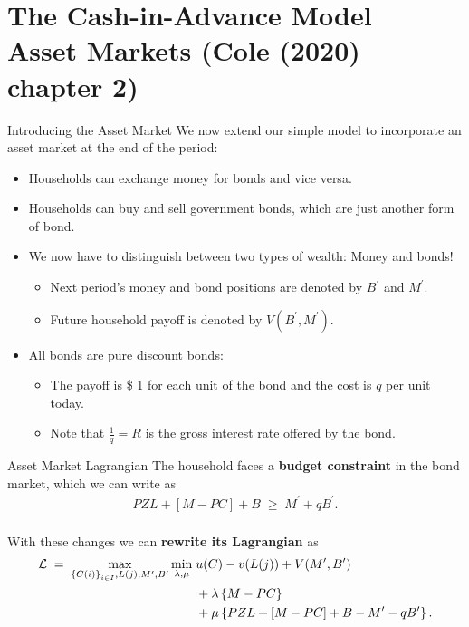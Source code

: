 \documentclass[10pt,c,aspectratio=1610,handout]{beamer}
\begin{document}
\section{The Cash-in-Advance Model\\\small{Asset Markets (Cole (2020) chapter 2)}}
\begin{frame}{Introducing the Asset Market}%
  We now extend our simple model to incorporate an asset market at the end of the period:%
  \pause%
  \begin{itemize}%
    \item[$\blacktriangleright$] Households can exchange money for bonds and vice versa.%
    \pause%
    \item[$\blacktriangleright$] Households can buy and sell government bonds, which are just another form of bond.%
    \pause%
    \item[$\blacktriangleright$] We now have to distinguish between two types of wealth: Money and bonds!%
    \begin{itemize}%
      \item[$\rightarrow$] Next period's money and bond positions are denoted by $B^{\prime}$ and $M^{\prime}$.%
      \item[$\rightarrow$] Future household payoff is denoted by $V(B^{\prime}, M^{\prime})$.%
    \end{itemize}%
    \pause%
    \item[$\blacktriangleright$] All bonds are pure discount bonds:%
    \begin{itemize}%
      \item[$\rightarrow$] The payoff is \$ 1 for each unit of the bond and the cost is $q$ per unit today.%
      \item[$\rightarrow$] Note that $\frac{1}{q} = R$ is the gross interest rate offered by the bond.%
    \end{itemize}%
  \end{itemize}%
\end{frame}%
\begin{frame}{Asset Market Lagrangian}%
  The household faces a \textbf{budget constraint} in the bond market, which we can write as%
  \begin{align*}%
    P Z L + \left[ M - PC \right] + B \; \geq \; M^{\prime} + q B^{\prime}.%
  \end{align*}\\%
  \vspace*{0.25in}%
  \pause%
  With these changes we can \textbf{rewrite its Lagrangian} as%
  \begin{align*}%
    \mathcal{L} \; = \; \max_{\left\{ C(i)\right\} _{i\in I},L(j),M^{\prime},B^{\prime }} \min_{\lambda ,\mu} & \; u(C) - v(L(j)) + V(M^{\prime}, B^{\prime})\label{Lagrangian 2}\\%
    & \; + \lambda \left\{ M - P C \right\}\notag\\%
    & \; + \mu \left\{ P Z L + \left[ M - P C \right] + B - M^{\prime} - q B^{\prime}\right\}. \notag%
  \end{align*}%
\end{frame}%
\end{document}
